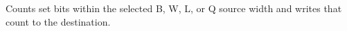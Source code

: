 Counts set bits within the selected B, W, L, or Q source width and writes that count to the destination.
